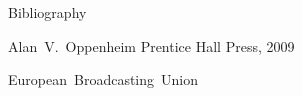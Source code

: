 \documentclass[compress,aspectratio=169]{beamer}
\begin{document}
\begin{frame}{Bibliography}
    \begin{thebibliography}{10}

            \beamertemplatebookbibitems
            Alan~V.~Oppenheim
            \newblock {}
            \newblock Prentice Hall Press, 2009

            \beamertemplatearticlebibitems
            European~Broadcasting~Union
            \newblock {}
    \end{thebibliography}
\end{frame}
\end{document}

